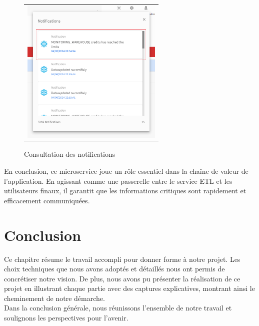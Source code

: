 \begin{itemize}
\begin{figure}[H]
\begin{tabular}[b]{c}
        \end{tabular} 
        \begin{tabular}[b]{c}
        \includegraphics[width=0.3\linewidth ,height=7cm]{img/captures/notifications/notifglobal.png} \\
        
        \end{tabular}
        \caption{Consultation des notifications}
    \label{fig:global4}
    \end{figure}
\end{itemize}
\par En conclusion, ce microservice joue un rôle essentiel dans la chaîne de valeur de l'application. En agissant comme une passerelle entre le service ETL et les utilisateurs finaux, il garantit que les informations critiques sont rapidement et efficacement communiquées.  

\section*{Conclusion}
Ce chapitre résume le travail accompli pour donner forme à notre projet. Les choix techniques que nous avons adoptés et détaillés nous ont permis de concrétiser notre vision. De plus, nous avons pu présenter la réalisation de ce projet en illustrant chaque partie avec des captures explicatives, montrant ainsi le cheminement de notre démarche. 
\\Dans la conclusion générale, nous réunissons l'ensemble de notre travail et soulignons les perspectives pour l'avenir. 